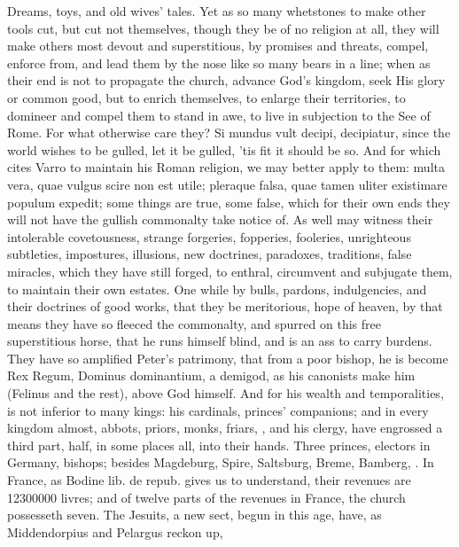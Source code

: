 {Dreams, toys, and old wives' tales. Yet as so many whetstones to
make other tools cut, but cut not themselves, though they be of no
religion at all, they will make others most devout and superstitious,
by promises and threats, compel, enforce from, and lead them by the
nose like so many bears in a line; when as their end is not to
propagate the church, advance God's kingdom, seek His glory or common
good, but to enrich themselves, to enlarge their territories, to
domineer and compel them to stand in awe, to live in subjection to the
See of Rome. For what otherwise care they? Si mundus vult decipi,
decipiatur, since the world wishes to be gulled, let it be gulled, 'tis
fit it should be so. And for which \Austin{} cites Varro to maintain
his Roman religion, we may better apply to them: multa vera, quae
vulgus scire non est utile; pleraque falsa, quae tamen uliter
existimare populum expedit; some things are true, some false, which for
their own ends they will not have the gullish commonalty take notice
of. As well may witness their intolerable covetousness, strange
forgeries, fopperies, fooleries, unrighteous subtleties, impostures,
illusions, new doctrines, paradoxes, traditions, false miracles, which
they have still forged, to enthral, circumvent and subjugate them, to
maintain their own estates. One while by bulls, pardons,
indulgencies, and their doctrines of good works, that they be
meritorious, hope of heaven, by that means they have so fleeced the
commonalty, and spurred on this free superstitious horse, that he runs
himself blind, and is an ass to carry burdens. They have so amplified
Peter's patrimony, that from a poor bishop, he is become Rex Regum,
Dominus dominantium, a demigod, as his canonists make him (Felinus and
the rest), above God himself. And for his wealth and 
temporalities, is not inferior to many kings: his cardinals,
princes' companions; and in every kingdom almost, abbots, priors,
monks, friars, \etc{}, and his clergy, have engrossed a third part,
half, in some places all, into their hands. Three princes, electors in
Germany, bishops; besides Magdeburg, Spire, Saltsburg, Breme, Bamberg,
\etc{}. In France, as Bodine lib. de repub. gives us to understand, their
revenues are 12\thinspace{}300\thinspace{}000 livres; and of twelve parts of the revenues in
France, the church possesseth seven. The Jesuits, a new sect, begun in
this age, have, as Middendorpius and Pelargus reckon up,
}
